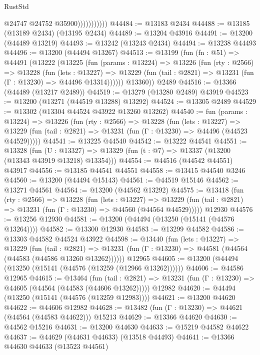 \begin{lexlean}{RustStd}
\begin{coremodule}
                          @24747
                          @24752
                          @35900)))))))))))
@44484 := @13183 @2434
@44488 := @13185 (@13189 @2434) (@13195 @2434)
@44489 := @13204 @43916
@44491 := @13200 (@44489 @13219)
@44493 := @13242 (@13243 @2434)
@44494 := @13238 @44493
@44496 := @13200 (@44494 @13267)
@44513 := @13199
    (fun (fn : @51) =>
    @44491
      (@13222
        (@13225
          (fun (params : @13224) =>
          @13226
            (fun (rty : @2566) =>
            @13228
              (fun (lets : @13227) =>
              @13229 (fun (tail : @2821) => @13231 (fun (Γ : @13230) => @44496 @13314))))))
        @13360))
    @2489
@44516 := @13366 (@44489 (@13217 @2489))
@44519 := @13279 (@13280 @2489) @43919
@44523 := @13200 (@13271 (@44519 @13288) @13292)
@44524 := @13305 @2489
@44529 := @13302 (@13304 @44524 @43922 @13260 @13262)
@44540 := fun (params : @13224) =>
  @13226
    (fun (rty : @2566) =>
    @13228
      (fun (lets : @13227) =>
      @13229 (fun (tail : @2821) => @13231 (fun (Γ : @13230) => @44496 (@44523 @44529)))))
@44541 := @13225 @44540
@44542 := @13222 @44541
@44551 := @13328
    (fun (U : @13327) => @13329 (fun (t : @7) => @13337 (@13200 (@13343 @43919 @13218) @13354)))
@44554 := @44516 (@44542 @44551) @43917
@44556 := @13185 @44541 @44551
@44558 := @13415 @44540 @3246
@44560 := @13200 (@44494 @15143)
@44561 := @44519 @15146
@44562 := @13271 @44561
@44564 := @13200 (@44562 @13292)
@44575 := @13418
    (fun (rty : @2566) =>
    @13228
      (fun (lets : @13227) =>
      @13229 (fun (tail : @2821) => @13231 (fun (Γ : @13230) => @44560 (@44564 @44529)))))
    @12930
@44576 := @13256 @12930
@44581 := @13200 (@44494 (@13250 (@15141 (@44576 @13264))))
@44582 := @13300 @12930
@44583 := @13299 @44582
@44586 := @13303 @44582 @44524 @43922
@44598 := @13440
    (fun (lets : @13227) =>
    @13229
      (fun (tail : @2821) =>
      @13231 (fun (Γ : @13230) => @44581 (@44564 (@44583 (@44586 @13260 @13262))))))
    @12965
@44605 := @13200 (@44494 (@13250 (@15141 (@44576 (@13259 (@12966 @13262))))))
@44606 := @44586 @12965
@44615 := @13464
    (fun (tail : @2821) => @13231 (fun (Γ : @13230) => @44605 (@44564 (@44583 (@44606 @13262)))))
    @12982
@44620 := @44494 (@13250 (@15141 (@44576 (@13259 @12983))))
@44621 := @13200 @44620
@44622 := @44606 @12982
@44628 := @13482 (fun (Γ : @13230) => @44621 (@44564 (@44583 @44622))) @15213
@44629 := @13366 @44620
@44630 := @44562 @15216
@44631 := @13200 @44630
@44633 := @15219 @44582 @44622
@44637 := @44629 (@44631 @44633) (@13518 @44493)
@44641 := @13366 @44630 @44633 (@13523 @44561)

\end{coremodule}
\end{lexlean}
